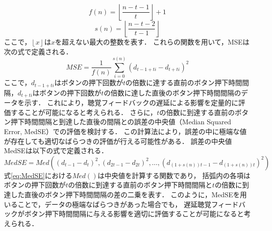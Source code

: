 \documentclass{article} %
\begin{document}
\begin{equation}
f(n) = \left\lfloor \frac{n-t-1}{t} \right\rfloor + 1
\end{equation}
\begin{equation}
s(n) = \left\lfloor \frac{n-t-2}{t-1} \right\rfloor
\end{equation}
ここで，$\left\lfloor x \right\rfloor$は$x$を超えない最大の整数を表す．
これらの関数を用いて，MSEは次の式で定義される．
\begin{equation}
MSE = \frac{1}{f(n)} \sum_{i=0}^{s(n)} (d_{t-1+ti} - d_{t+ti})^2
\end{equation}
ここで，$d_{t-1+ti}$はボタンの押下回数が$t$の倍数に達する直前のボタン押下時間間隔，$d_{t+ti}$はボタンの押下回数が$t$の倍数に達した直後のボタン押下時間間隔のデータを示す．
これにより，聴覚フィードバックの遅延による影響を定量的に評価することが可能になると考えられる．
さらに，$t$の倍数に到達する直前のボタン押下時間間隔と到達した直後の間隔との誤差の中央値（Median Squared Error, MedSE）での評価を検討する．
この計算法により，誤差の中に極端な値が存在しても適切なばらつきの評価が行える可能性がある．
誤差の中央値MedSEは以下の式で定義される．
\begin{equation}
MedSE = Med\left((d_{t-1}-d_{t})^2, (d_{2t-1}-d_{2t})^2, \ldots, (d_{(1+s(n))t-1}-d_{(1+s(n))t})^2\right) \label{eq:MedSE}
\end{equation}
式\ref{eq:MedSE}における$Med()$は中央値を計算する関数であり，
括弧内の各項はボタンの押下回数が$t$の倍数に到達する直前のボタン押下時間間隔と$t$の倍数に到達した直後のボタン押下時間間隔の差の二乗を表す．
このように，MedSEを用いることで，データの極端なばらつきがあった場合でも，
遅延聴覚フィードバックがボタン押下時間間隔に与える影響を適切に評価することが可能になると考えられる．

\end{document}
